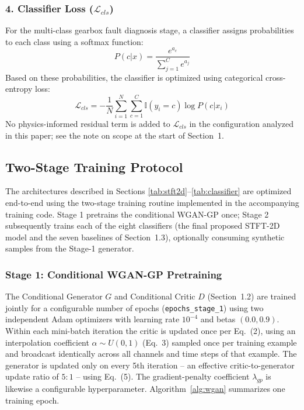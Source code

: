 \documentclass[12pt]{article}
\begin{document}
\subsubsection*{4. Classifier Loss ($\mathcal{L}_{cls}$)}
For the multi-class gearbox fault diagnosis stage, a classifier assigns probabilities to each class using a softmax function:
\begin{equation}
    P(c|x) = \frac{e^{a_{c}}}{\sum_{j=1}^{C}e^{a_{j}}}
\end{equation}
Based on these probabilities, the classifier is optimized using categorical cross-entropy loss:
\begin{equation}
    \mathcal{L}_{cls} = -\frac{1}{N}\sum_{i=1}^{N}\sum_{c=1}^{C}\mathbb{I}(y_{i}=c)\log P(c|x_{i})
\end{equation}
No physics-informed residual term is added to $\mathcal{L}_{cls}$ in the configuration analyzed in this paper; see the note on scope at the start of Section~1.

\subsection{Two-Stage Training Protocol}
\label{sec:training}
The architectures described in Sections \ref{tab:stft2d}--\ref{tab:classifier} are optimized end-to-end using the two-stage training routine implemented in the accompanying training code. Stage 1 pretrains the conditional WGAN-GP once; Stage 2 subsequently trains each of the eight classifiers (the final proposed STFT-2D model and the seven baselines of Section~1.3), optionally consuming synthetic samples from the Stage-1 generator.

\subsubsection*{Stage 1: Conditional WGAN-GP Pretraining}
The Conditional Generator $G$ and Conditional Critic $D$ (Section~1.2) are trained jointly for a configurable number of epochs (\texttt{epochs\_stage\_1}) using two independent Adam optimizers with learning rate $10^{-4}$ and betas $(0.0, 0.9)$. Within each mini-batch iteration the critic is updated once per Eq.~(2), using an interpolation coefficient $\alpha\sim U(0,1)$ (Eq.~3) sampled once per training example and broadcast identically across all channels and time steps of that example. The generator is updated only on every 5th iteration -- an effective critic-to-generator update ratio of $5{:}1$ -- using Eq.~(5). The gradient-penalty coefficient $\lambda_{gp}$ is likewise a configurable hyperparameter. Algorithm~\ref{alg:wgan} summarizes one training epoch.
\end{document}
